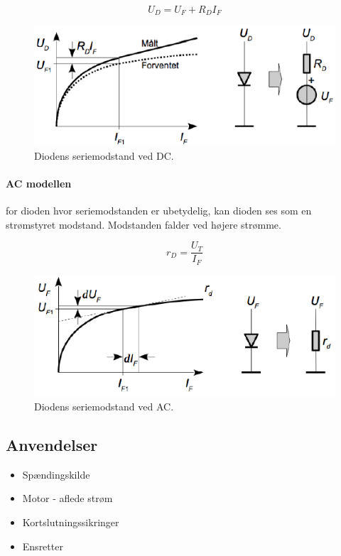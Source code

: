 \documentclass[danish]{article}
\begin{document}
\begin{equation}
U_D = U_F + R_D I_F
\end{equation}

\begin{figure} [H]
	\centering
	\includegraphics[width=\linewidth]{graphics/DC_diode}
	\caption{Diodens seriemodstand ved DC.}
	\label{fig:DC_diode}
\end{figure}

\newpage
\paragraph{AC modellen} for dioden hvor seriemodstanden er ubetydelig, kan dioden ses som en strømstyret modstand. 
Modstanden falder ved højere strømme.

\begin{equation}
r_D = \dfrac{U_T}{I_F}
\end{equation}

\begin{figure} [H]
	\centering
	\includegraphics[width=\linewidth]{graphics/ACdiode}
	\caption{Diodens seriemodstand ved AC.}
	\label{fig:AC_diode}
\end{figure}

\subsection{Anvendelser}
\begin{itemize}
	\item Spændingskilde
	\item Motor - aflede strøm
	\item Kortslutningssikringer
	\item Ensretter 
\end{itemize}
\end{document}
